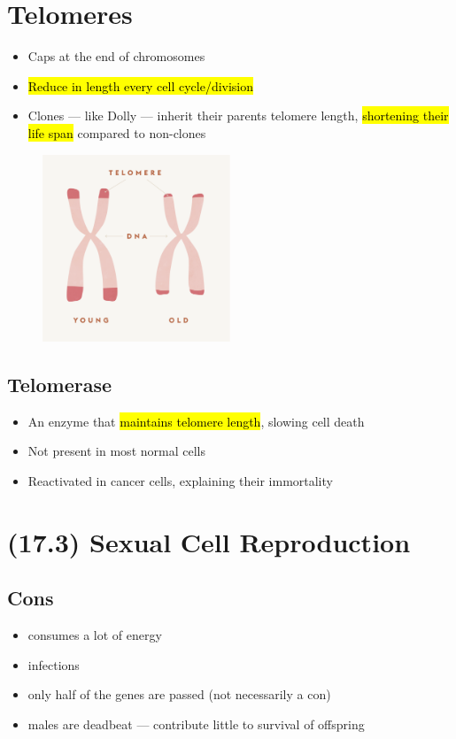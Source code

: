 \documentclass[a4paper,12pt]{article}
\begin{document}
\section{Telomeres}
\begin{itemize}
    \item{Caps at the end of chromosomes}
    \item{\hl{Reduce in length every cell cycle/division}}
    \item{Clones --- like Dolly --- inherit their parents telomere length, \hl{shortening their life span} compared to non-clones} 
\end{itemize}

\begin{figure}[H]
    \centering
    \includegraphics[width=0.50\textwidth]{telomere}
\end{figure}

\subsection{Telomerase}
\begin{itemize}
    \item{An enzyme that \hl{maintains telomere length}, slowing cell death}
    \item{Not present in most normal cells}
    \item{Reactivated in cancer cells, explaining their immortality}
\end{itemize}

\section{(17.3) Sexual Cell Reproduction}

\subsection{Cons}
\begin{itemize}
    \item{consumes a lot of energy}
    \item{infections}
    \item{only half of the genes are passed (not necessarily a con)}
    \item{males are deadbeat --- contribute little to survival of offspring}
\end{itemize}
\end{document}
